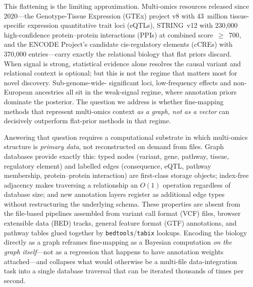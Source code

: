 This flattening is the limiting approximation. Multi-omics resources
released since 2020---the Genotype-Tissue Expression (GTEx) project
v8 with 43~million tissue-specific expression quantitative trait
loci (eQTLs)\cite{gtex2020}, STRING~v12 with 230{,}000 high-confidence
protein--protein interactions (PPIs) at combined
score~$\geq$~700\cite{szklarczyk2023string}, and the ENCODE Project's
candidate cis-regulatory elements (cCREs) with 370{,}000
entries\cite{encode2020expanded}---carry exactly the relational
biology that flat priors discard. When signal is strong, statistical evidence alone resolves
the causal variant and relational context is optional; but this is
not the regime that matters most for novel discovery. Sub-genome-wide-
significant loci, low-frequency effects and non-European ancestries
all sit in the weak-signal regime, where annotation priors dominate
the posterior. The question we address is whether fine-mapping
methods that represent multi-omics context \emph{as a graph, not as a
vector} can decisively outperform flat-prior methods in that regime.

Answering that question requires a computational substrate in which
multi-omics structure is \emph{primary data}, not reconstructed on
demand from files. Graph databases provide exactly
this\cite{robinson2015graph}: typed nodes (variant, gene, pathway,
tissue, regulatory element) and labelled edges (consequence, eQTL,
pathway membership, protein--protein interaction) are first-class
storage objects; index-free adjacency makes traversing a
relationship an $O(1)$ operation regardless of database size; and
new annotation layers register as additional edge types without
restructuring the underlying schema. These properties are absent
from the file-based pipelines assembled from variant call format
(VCF) files, browser extensible data (BED) tracks, general feature
format (GTF) annotations, and pathway tables glued together by
\texttt{bedtools}/\texttt{tabix} lookups. Encoding the biology
directly as a graph reframes fine-mapping as a Bayesian computation
\emph{on the graph itself}---not as a regression that happens to
have annotation weights attached---and collapses what would
otherwise be a multi-file data-integration task into a single
database traversal that can be iterated thousands of times per
second.

